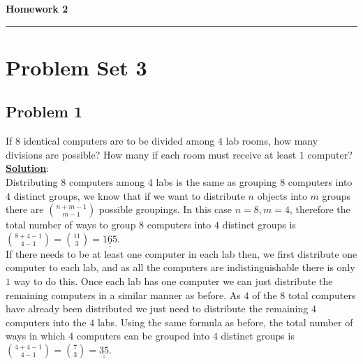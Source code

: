 \documentclass[11pt,letter paper]{report}
\begin{document}

\begin{center}
{\bf \Large Homework 2} 
\vspace{0.2cm}
\hrule
\end{center}

%
\section*{Problem Set 3}

\subsection*{Problem 1}
If $8$ identical computers are to be divided among $4$ lab rooms, how many divisions are possible? How many if each room must receive at least $1$ computer?\\[0.1cm]
{\bf \underline{Solution}}:\\ 
Distributing $8$ computers among $4$ labs is the same as grouping $8$ computers into $4$ distinct groups, we know that if we want to distribute $n$ objects into $m$ groups there are $\binom{n+m-1}{m-1}$ possible groupings. In this case $n=8, m=4$, therefore the total number of ways to group $8$ computers into $4$ distinct groups is $\binom{8+4-1}{4-1}=\binom{11}{3}=\underline{\underline{165}}$.\\
If there needs to be at least one computer in each lab then, we first distribute one computer to each lab, and as all the computers are indistinguishable there is only $1$ way to do this. Once each lab has one computer we can just distribute the remaining computers in a similar manner as before. As $4$ of the $8$ total computers have already been distributed we just need to distribute the remaining $4$ computers into the $4$ labs. Using the same formula as before, the total number of ways in which $4$ computers can be grouped into $4$ distinct groups is $\binom{4+4-1}{4-1}=\binom{7}{3}=\underline{\underline{35}}$.

\end{document}
